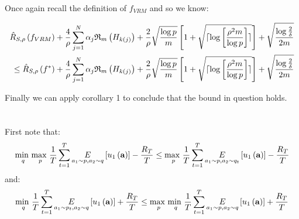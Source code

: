 \documentclass[]{article}
\begin{document}
\noindent Once again recall the definition of $f_{VRM}$ and so we know:

\begin{equation}
\begin{split}
\hat{R}_{S,\rho}\left(f_{VRM}\right) + \frac{4}{\rho} \sum_{j=1}^{N} \alpha_j \mathfrak{R}_m \left( H_{k \left( j \right)} \right) + \frac{2}{\rho} \sqrt{\frac{\log p}{m}} \left[1+\sqrt{\lceil \log \left[ \frac{\rho^2 m}{\log p} \right]\rceil}\right] + \sqrt{\frac{\log \frac{2}{\delta}}{2m}} \\
\le \hat{R}_{S,\rho}\left(f^*\right) + \frac{4}{\rho} \sum_{j=1}^{N} \alpha_j \mathfrak{R}_m \left( H_{k \left( j \right)} \right) + \frac{2}{\rho} \sqrt{\frac{\log p}{m}} \left[1+\sqrt{\lceil \log \left[ \frac{\rho^2 m}{\log p} \right]\rceil}\right] + \sqrt{\frac{\log \frac{2}{\delta}}{2m}}
\end{split}
\notag
\end{equation}

\noindent Finally we can apply corollary 1 to conclude that the bound in question holds.	

\section{}
\subsection{}

\subsection{}
First note that:
\begin{equation}
	\underset{q}{\text{min }}\underset{p}{\text{max }}\frac{1}{T}\sum_{t=1}^{T}\underset{a_1 \sim p, a_2 \sim q}{E}\left[u_1\left(\textbf{a}\right)\right] - \frac{R_T}{T}
	\le
	\underset{p}{\text{max }}\frac{1}{T}\sum_{t=1}^{T}\underset{a_1 \sim p, a_2 \sim q_t}{E}\left[u_1\left(\textbf{a}\right)\right] - \frac{R_T}{T}
\notag
\end{equation}
\noindent and:
\begin{equation}
	\underset{q}{\text{min }}\frac{1}{T}\sum_{t=1}^{T}\underset{a_1 \sim p_t, a_2 \sim q}{E}\left[u_1\left(\textbf{a}\right)\right] + \frac{R_T}{T}
	\le
	\underset{p}{\text{max }}\underset{q}{\text{min }}\frac{1}{T}\sum_{t=1}^{T}\underset{a_1 \sim p, a_2 \sim q}{E}\left[u_1\left(\textbf{a}\right)\right] + \frac{R_T}{T}
\notag
\end{equation}
\end{document}
